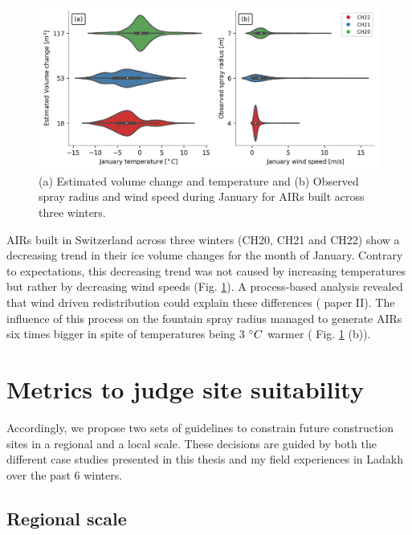\begin{figure}[htb]
\centering
\includegraphics[width=\textwidth]{figs/CH_diffs.jpg}
\caption{(a) Estimated volume change and temperature and (b) Observed spray radius and wind speed
during January for AIRs built across three winters. } 
\label{fig:CH_diffs}
\end{figure}

AIRs built in Switzerland across three winters (CH20, CH21 and CH22) show a decreasing trend in their ice volume
changes for the month of January. Contrary to expectations, this decreasing trend was not caused by increasing
temperatures but rather by decreasing wind speeds (Fig. \ref{fig:CH_diffs}). A process-based analysis  revealed
that wind driven redistribution could explain these differences ( paper II). The influence of this process on
the fountain spray radius managed to generate AIRs six times bigger in spite of temperatures being 3 $^{\circ} C$
warmer ( Fig. \ref{fig:CH_diffs} (b)). 



\section{Metrics to judge site suitability}

Accordingly, we propose two sets of guidelines to constrain future construction sites in a regional and a local
scale. These decisions are guided by both the different case studies presented in this thesis and my field
experiences in Ladakh over the past 6 winters.

\subsection{Regional scale}


